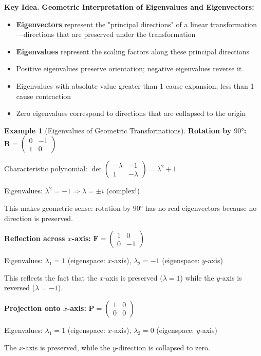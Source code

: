 \documentclass[12pt]{article}
\numberwithin{equation}{section}
\newcommand{\mat}[1]{\mathbf{#1}}        %
\theoremstyle{plain}
\theoremstyle{definition}
\newtheorem{example}[theorem]{Example}
\theoremstyle{remark}
\newenvironment{keyidea}{\begin{tcolorbox}\textbf{Key Idea.}}{\end{tcolorbox}}
\begin{document}
\begin{keyidea}
\textbf{Geometric Interpretation of Eigenvalues and Eigenvectors:}
\begin{itemize}
\item \textbf{Eigenvectors} represent the "principal directions" of a linear transformation—directions that are preserved under the transformation
\item \textbf{Eigenvalues} represent the scaling factors along these principal directions
\item Positive eigenvalues preserve orientation; negative eigenvalues reverse it
\item Eigenvalues with absolute value greater than 1 cause expansion; less than 1 cause contraction
\item Zero eigenvalues correspond to directions that are collapsed to the origin
\end{itemize}
\end{keyidea}

\begin{example}[Eigenvalues of Geometric Transformations]
\textbf{Rotation by $90°$:} $\mat{R} = \begin{pmatrix} 0 & -1 \\ 1 & 0 \end{pmatrix}$

Characteristic polynomial: $\det\begin{pmatrix} -\lambda & -1 \\ 1 & -\lambda \end{pmatrix} = \lambda^2 + 1$

Eigenvalues: $\lambda^2 = -1 \Rightarrow \lambda = \pm i$ (complex!)

This makes geometric sense: rotation by $90°$ has no real eigenvectors because no direction is preserved.

\textbf{Reflection across $x$-axis:} $\mat{F} = \begin{pmatrix} 1 & 0 \\ 0 & -1 \end{pmatrix}$

Eigenvalues: $\lambda_1 = 1$ (eigenspace: $x$-axis), $\lambda_2 = -1$ (eigenspace: $y$-axis)

This reflects the fact that the $x$-axis is preserved ($\lambda = 1$) while the $y$-axis is reversed ($\lambda = -1$).

\textbf{Projection onto $x$-axis:} $\mat{P} = \begin{pmatrix} 1 & 0 \\ 0 & 0 \end{pmatrix}$

Eigenvalues: $\lambda_1 = 1$ (eigenspace: $x$-axis), $\lambda_2 = 0$ (eigenspace: $y$-axis)

The $x$-axis is preserved, while the $y$-direction is collapsed to zero.
\end{example}
\end{document}
